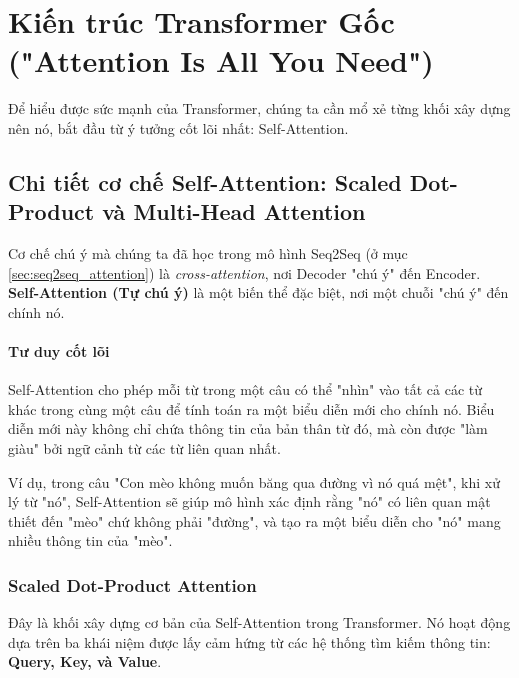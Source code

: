 
\section{Kiến trúc Transformer Gốc ("Attention Is All You Need")}
\label{sec:vanilla_transformer}

Để hiểu được sức mạnh của Transformer, chúng ta cần mổ xẻ từng khối xây dựng nên nó, bắt đầu từ ý tưởng cốt lõi nhất: Self-Attention.

\subsection{Chi tiết cơ chế Self-Attention: Scaled Dot-Product và Multi-Head Attention}
\label{ssec:self_attention}

Cơ chế chú ý mà chúng ta đã học trong mô hình Seq2Seq (ở mục \ref{sec:seq2seq_attention}) là \textit{cross-attention}, nơi Decoder "chú ý" đến Encoder. \textbf{Self-Attention (Tự chú ý)} là một biến thể đặc biệt, nơi một chuỗi "chú ý" đến chính nó.

\paragraph{Tư duy cốt lõi}
Self-Attention cho phép mỗi từ trong một câu có thể "nhìn" vào tất cả các từ khác trong cùng một câu để tính toán ra một biểu diễn mới cho chính nó. Biểu diễn mới này không chỉ chứa thông tin của bản thân từ đó, mà còn được "làm giàu" bởi ngữ cảnh từ các từ liên quan nhất.

Ví dụ, trong câu "Con mèo không muốn băng qua đường vì nó quá mệt", khi xử lý từ "nó", Self-Attention sẽ giúp mô hình xác định rằng "nó" có liên quan mật thiết đến "mèo" chứ không phải "đường", và tạo ra một biểu diễn cho "nó" mang nhiều thông tin của "mèo".

\subsubsection{Scaled Dot-Product Attention}
Đây là khối xây dựng cơ bản của Self-Attention trong Transformer. Nó hoạt động dựa trên ba khái niệm được lấy cảm hứng từ các hệ thống tìm kiếm thông tin: \textbf{Query, Key, và Value}.

